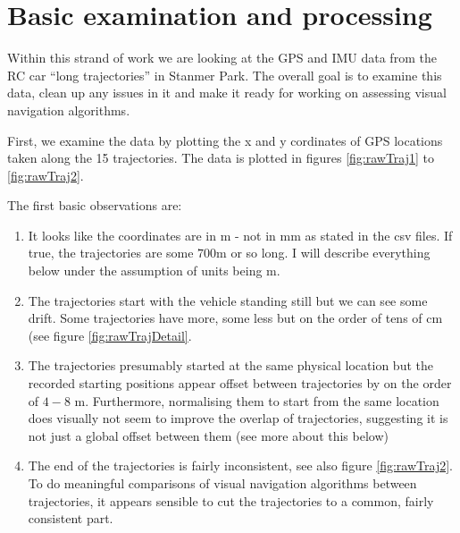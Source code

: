 \documentclass[a4]{article}
\begin{document}
\section{Basic examination and processing}
Within this strand of work we are looking at the GPS and IMU data from
the RC car ``long trajectories'' in Stanmer Park. The overall goal is to
examine this data, clean up any issues in it and make it ready for
working on assessing visual navigation algorithms.

First, we examine the data by plotting the x and y cordinates of GPS
locations taken along the 15 trajectories. The data is plotted in
figures \ref{fig:rawTraj1} to \ref{fig:rawTraj2}.

The first basic observations are:
\begin{enumerate}
  \item It looks like the coordinates are in m - not in mm as
    stated in the csv files. If true, the trajectories are some $700$m
    or so long. I will describe everything below under the assumption
    of units being m.
  \item The trajectories start with the vehicle standing still but we
    can see some drift. Some trajectories have more, some less but on
    the order of tens of cm (see figure \ref{fig:rawTrajDetail}.
  \item The trajectories presumably started at the same physical
    location but the recorded starting positions appear offset between
    trajectories by on the order of $4-8$ m. Furthermore, normalising
    them to start from the same location does visually not seem to
    improve the overlap of trajectories, suggesting it is not just a
    global offset between them (see more about this below)
  \item The end of the trajectories is fairly inconsistent, see also
    figure \ref{fig:rawTraj2}. To do meaningful comparisons of visual
    navigation algorithms between trajectories, it appears sensible to
    cut the trajectories to a 
    common, fairly consistent part.
\end{enumerate}
\end{document}
